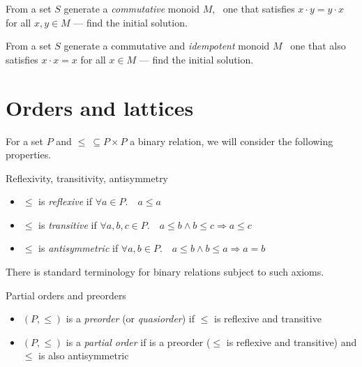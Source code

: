     \begin{exercise}
    From a set $S$ generate a \textit{commutative} monoid $M$, \ie~one that
    satisfies $x \cdot y = y \cdot x$ for all $x, y \in M$ --- find the initial
    solution.
    \end{exercise}
    
    \begin{exercise}
    From a set $S$ generate a commutative and \textit{idempotent} monoid $M$ \ie~one
    that also satisfies $x \cdot x = x$ for all $x \in M$ --- find the initial
    solution.
    \end{exercise}
    
    \section{Orders and lattices}
    
    For a set $P$ and $\leq\ \subseteq P \times P$ a binary relation, we will
    consider the following properties.
    
    \begin{definition}
    Reflexivity, transitivity, antisymmetry
    \begin{itemize}[noitemsep,topsep=0pt]
        \item $\leq$ is \textit{reflexive} if $\forall a \in P.\quad a \leq a$
        \item $\leq$ is \textit{transitive} if
          $\forall a,b,c \in P. \quad a \leq b \wedge b \leq c \Rightarrow a \leq c$
        \item $\leq$ is \textit{antisymmetric} if $\forall a,b \in P. \quad
          a \leq b \wedge b \leq a \Rightarrow a = b$
    \end{itemize}
    \end{definition}
    
    There is standard terminology for binary relations subject to such axioms.
    
    \begin{definition} Partial orders and preorders
    \begin{itemize}[noitemsep,topsep=0pt]
    \item $(P, \leq)$ is a \emph{preorder} (or \emph{quasiorder}) if $\leq$ is
    reflexive and transitive
    \item $(P, \leq)$ is a \emph{partial order} if is a preorder ($\leq$ is
      reflexive and transitive) and $\leq$ is also antisymmetric
    \end{itemize}
    \end{definition}
    
